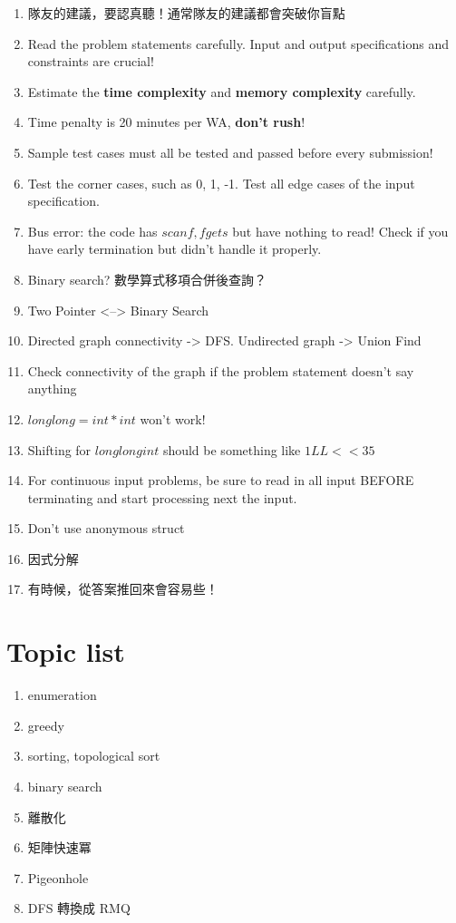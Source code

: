 \documentclass[10pt,oneside]{article}
\begin{document}
\begin{landscape}
\begin{multicols}{2}
\begin{enumerate}
	\item 隊友的建議，要認真聽！通常隊友的建議都會突破你盲點
	\item Read the problem statements carefully. Input and output specifications and constraints are crucial!
	\item Estimate the \textbf{time complexity} and \textbf{memory complexity} carefully.
	\item Time penalty is 20 minutes per WA, \textbf{don't rush}!
	\item Sample test cases must all be tested and passed before every submission!
	\item Test the corner cases, such as 0, 1, -1. Test all edge cases of the input specification.
	\item Bus error: the code has $scanf, fgets$ but have nothing to read! Check if you have early termination but didn't handle it properly.
	\item Binary search? 數學算式移項合併後查詢？
	\item Two Pointer <--> Binary Search
	\item Directed graph connectivity -> DFS. Undirected graph -> Union Find
	\item Check connectivity of the graph if the problem statement doesn't say anything
	\item $long long = int * int$ won't work!
	\item Shifting for $long long int$ should be something like $1LL << 35$
	\item For continuous input problems, be sure to read in all input BEFORE terminating and start processing next the input.
	\item Don't use anonymous struct
	\item 因式分解
	\item 有時候，從答案推回來會容易些！
\end{enumerate}

\section{Topic list}

\begin{enumerate}
	\item enumeration
	\item greedy 
	\item sorting, topological sort
	\item binary search
	\item 離散化
	\item 矩陣快速冪
	\item Pigeonhole 
	\item DFS 轉換成 RMQ
\end{enumerate}


\end{multicols}
\end{landscape}
\end{document}
